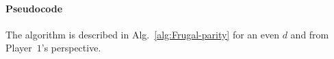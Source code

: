 \documentclass{article}\providecommand{\nequiv}{\not\equiv}\usepackage[a4paper,margin=20mm]{geometry}
\newcommand{\Call}[2]{\ProcNameSty{#1}(#2)} %
\newcommand{\PO}{Player~$1$\xspace}
\newcommand{\G}{{\mathcal G}}
\newcommand{\R}{{\mathcal R}}
\renewcommand{\S}{{\mathcal S}}
\newcommand{\fr}{\texttt{fr}}
\newcommand{\notFd}{V \setminus F_d}
\newcommand{\thresh}{\texttt{Th}\xspace}
\newcommand{\zug}[1]{\langle #1  \rangle}
\renewcommand{\set}[1]{\{ #1  \}}
\begin{document}
\paragraph*{Pseudocode}

The algorithm is described in Alg.~\ref{alg:Frugal-parity} for an even $d$ and from \PO's perspective.



\end{document}
